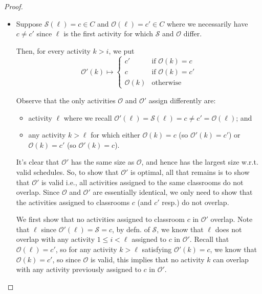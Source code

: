 \documentclass{article}
\theoremstyle{plain}%
\theoremstyle{definition}
\theoremstyle{remark}
\begin{document}
\begin{proof}
\begin{itemize}
            \item Suppose $\mathcal{S}(\ell) = c \in C$
                and $\mathcal{O}(\ell) = c' \in C$ where we necessarily have $c
                \neq c'$ since $\ell$ is the first activity for which
                $\mathcal{S}$ and $\mathcal{O}$ differ.

            Then, for every activity $k > i$, we put
            \begin{equation}
                \mathcal{O}'(k) \mapsto
                    \begin{cases}
                        c' & \text{if $\mathcal{O}(k) = c$} \\
                        c & \text{if $\mathcal{O}(k) = c'$} \\
                        \mathcal{O}(k) & \text{otherwise}
                    \end{cases}
            \end{equation}

            Observe that the only activities $\mathcal{O}$ and $\mathcal{O}'$
                assign differently are:
            \begin{itemize}
                \item activity $\ell$ where we recall $\mathcal{O}'(\ell) = \mathcal{S}(\ell) =c \neq c' = \mathcal{O}(\ell)$; and
                \item any activity $k > \ell$ for which either 
                    $\mathcal{O}(k) = c$ (so $\mathcal{O}'(k) = c'$)
                    or $\mathcal{O}(k) =c'$ (so $\mathcal{O}'(k) = c$).
            \end{itemize}

            It's clear that $\mathcal{O}'$ has the same size as $\mathcal{O}$,
                and hence has the largest size w.r.t. valid schedules.
            So, to show that $\mathcal{O}'$ is optimal, all that remains is to
                show that $\mathcal{O}'$ is valid i.e., all activities assigned
                to the same classrooms do not overlap.
            Since $\mathcal{O}$ and $\mathcal{O}'$ are essentially identical,
                we only need to show that the activities assigned to classrooms
                $c$ (and $c'$ resp.)
                do not overlap.

            We first show that no activities assigned to classroom $c$
                in $\mathcal{O}'$ overlap.
            Note that $\ell$ since $\mathcal{O}'(\ell) = \mathcal{S} = c$,
                by defn. of $\mathcal{S}$,
                    we know that $\ell$ does not overlap with any activity 
                    $1 \le i < \ell$ assigned to $c$ in $\mathcal{O}'$.
            Recall that $\mathcal{O}(\ell) = c'$, so for any activity $k > \ell$ 
                satisfying $\mathcal{O}'(k) = c$, we know that $\mathcal{O}(k) = c'$,
                so since $\mathcal{O}$ is valid, this implies that no activity
                $k$ can overlap with any activity previously assigned to $c$ in
                $\mathcal{O}'$.


\end{itemize}
\end{proof}
\end{document}
